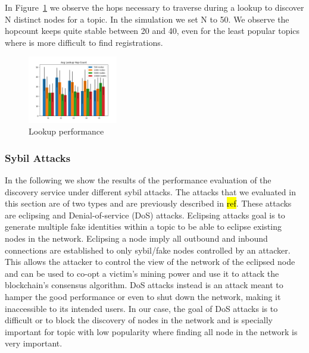 In Figure~\ref{fig:hopcount} we observe the hops necessary to traverse during a lookup to discover N distinct nodes for a topic.
In the simulation we set N to 50.
We observe the hopcount keeps quite stable between 20 and 40, even for the least popular topics where is more difficult to find registrations.


\begin{figure}[h!]
\centering
\includegraphics[width=0.35\textwidth]{img/eval/lookup_hopcount.png}
\caption{Lookup performance}
\label{fig:hopcount}
\vspace{-0.15in}
\end{figure}

\subsubsection{Sybil Attacks}

In the following we show the results of the performance evaluation of the discovery service under different sybil attacks.  The attacks that we evaluated in this section are of two types and are previously described in \hl{ref}. These attacks are eclipsing  and Denial-of-service (DoS) attacks.
Eclipsing attacks goal is to generate multiple fake identities within a topic to be able to eclipse existing nodes in the network.
Eclipsing a node imply all outbound and inbound connections are established to only sybil/fake nodes controlled by an attacker.
This allows the attacker to control the view of the network of the eclipsed node and can be used to co-opt a victim's mining power and use it to attack the blockchain's consensus algorithm.
DoS attacks instead is an attack meant to hamper the good performance or even to shut down the network, making it inaccessible to its intended users.  
In our case,  the goal of DoS attacks is to difficult or to block the discovery of nodes in the network and is specially important for topic with low popularity where finding all node in the network is very important.

